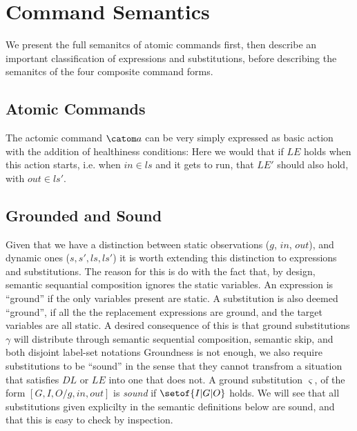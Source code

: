 \section{Command Semantics}\label{sec:semantics}

We present the full semanitcs of atomic commands first,
then describe an important classification of expressions and substitutions,
before describing the semanitcs of the four composite command forms.

\subsection{Atomic Commands}\label{ssec:atomic}

The actomic command $\catom a$ can be very simply expressed as basic action
with the addition of healthiness conditions:
Here we would that if $LE$ holds when this action starts,
i.e. when $in \in ls$ and it gets to run,
that $LE'$ should also hold, with $out \in ls'$.

\subsection{Grounded and Sound}

Given that we have a distinction between static observations ($g$, $in$, $out$),
and dynamic ones ($s,s',ls,ls'$) it is worth extending this distinction
to expressions and substitutions.
The reason for this is do with the fact that, by design,
semantic sequantial composition ignores the static variables.
An expression is ``ground'' if the only variables present are static.
A substitution is also deemed ``ground'',
if all the the replacement expressions are ground,
and the target variables are all static.
A desired consequence of this is that
ground substitutions $\gamma$
will distribute through semantic sequential composition,
semantic skip,
and both disjoint label-set notations
Groundness is not enough, we also require substitutions to be ``sound''
in the sense that they cannot transfrom a situation that satisfies $DL$
or $LE$ into one that does not.
A ground substitution $\varsigma$, of the form $[G,I,O/g,in,out]$ is \emph{sound}
if $\setof{I|G|O}$ holds.
We will see that all substitutions given explicilty in the semantic definitions
below are sound, and that this is easy to check by inspection.


